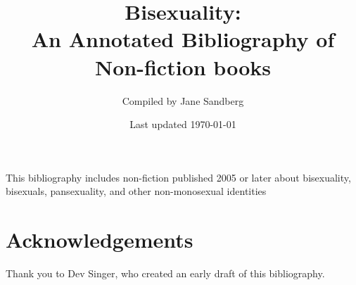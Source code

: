 \documentclass[12pt]{article}
\title{Bisexuality: \\An Annotated Bibliography of Non-fiction books}
\author{Compiled by Jane Sandberg}
\date{Last updated \today}
\begin{document}
\maketitle

 
 This bibliography includes non-fiction published 2005 or later about bisexuality, bisexuals, pansexuality, and other non-monosexual identities
 
 
 \newpage
 \tableofcontents

 
 \nocite{*}
 
 \printbibliography[title={General non-fiction},keyword={general},heading=bibnumbered]
 \printbibliography[title={Biography},keyword={biography},heading=bibnumbered]
 \printbibliography[title={Documentary films},keyword={documentary},heading=bibnumbered]
 
 \section{Acknowledgements}
 Thank you to Dev Singer, who created an early draft of this bibliography.
\end{document}
